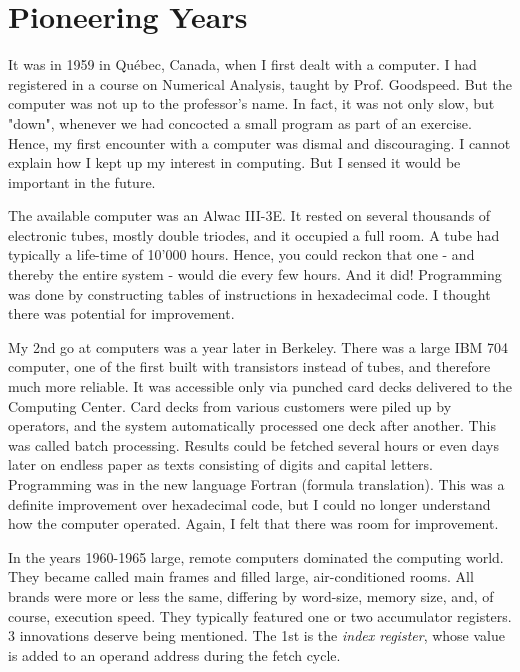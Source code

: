 \section{Pioneering Years}
It was in 1959 in Québec, Canada, when I first dealt with a computer. I had
registered in a course on Numerical Analysis, taught by Prof. Goodspeed. But the
computer was not up to the professor's name. In fact, it was not only slow, but
"down", whenever we had concocted a small program as part of an exercise.
Hence, my first encounter with a computer was dismal and discouraging. I cannot
explain how I kept up my interest in computing. But I sensed it would be important
in the future.

The available computer was an Alwac III-3E. It rested on several thousands of
electronic tubes, mostly double triodes, and it occupied a full room. A tube had
typically a life-time of 10'000 hours. Hence, you could reckon that one - and
thereby the entire system - would die every few hours. And it did! Programming
was done by constructing tables of instructions in hexadecimal code. I thought
there was potential for improvement.

My 2nd go at computers was a year later in Berkeley. There was a large IBM 704
computer, one of the first built with transistors instead of tubes, and therefore
much more reliable. It was accessible only via punched card decks delivered to the
Computing Center. Card decks from various customers were piled up by operators,
and the system automatically processed one deck after another. This was called
batch processing. Results could be fetched several hours or even days later on
endless paper as texts consisting of digits and capital letters. Programming was in
the new language Fortran (formula translation). This was a definite improvement
over hexadecimal code, but I could no longer understand how the computer
operated. Again, I felt that there was room for improvement.

In the years 1960-1965 large, remote computers dominated the computing world.
They became called main frames and filled large, air-conditioned rooms. All brands
were more or less the same, differing by word-size, memory size, and, of course,
execution speed. They typically featured one or two accumulator registers. 3 
innovations deserve being mentioned. The 1st is the \emph{index register}, whose
value is added to an operand address during the fetch cycle.

